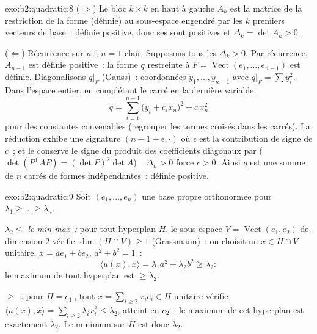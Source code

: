 \begin{solution}{exo:b2:quadratic:8}
($\Rightarrow$) Le bloc $k \times k$ en haut à gauche $A_k$ est la
matrice de la restriction de la forme (définie) au sous-espace
engendré par les $k$ premiers vecteurs de base~: définie positive,
donc ses  sont positives et $\Delta_k = \det A_k >
0$.

($\Leftarrow$) Récurrence sur $n$~; $n = 1$ clair. Supposons tous
les $\Delta_k > 0$. Par récurrence, $A_{n-1}$ est définie positive~:
la forme $q$ restreinte à $F = \operatorname{Vect}(e_1, \dots,
e_{n-1})$ est définie. Diagonalisons $q|_F$ (Gauss)~: coordonnées
$y_1, \dots, y_{n-1}$ avec $q|_F = \sum y_i^2$. Dans l'espace
entier, en complétant le carré en la dernière variable,
\[
q = \sum_{i=1}^{n-1} \bigl(y_i + c_i x_n\bigr)^2 + c\,x_n^2
\]
pour des constantes convenables (regrouper les termes croisés dans
les carrés). La réduction exhibe une signature $(n-1 + \epsilon,
\cdot)$ où $\epsilon$ est la contribution de signe de $c$~; et le
 conserve le signe du produit des coefficients diagonaux
par  ($\det(P^{\mathsf T}AP) = (\det P)^2\det A$)~:
$\Delta_n > 0$ force $c > 0$. Ainsi $q$ est une somme de $n$ carrés
de formes indépendantes~: définie positive.
\end{solution}

\begin{solution}{exo:b2:quadratic:9}
Soit $(e_1, \dots, e_n)$ une base propre orthonormée pour $\lambda_1
\geq \dots \geq \lambda_n$.

\emph{$\lambda_2 \leq$ le min-max~:} pour tout hyperplan $H$, le
sous-espace $V = \operatorname{Vect}(e_1, e_2)$ de dimension $2$
vérifie $\dim(H \cap V) \geq 1$ (Grassmann)~: on choisit un $x \in H
\cap V$ unitaire, $x = ae_1 + be_2$, $a^2 + b^2 = 1$~:
\[
\langle u(x), x\rangle = \lambda_1 a^2 + \lambda_2 b^2 \geq
\lambda_2 :
\]
le maximum de tout hyperplan est $\geq \lambda_2$.

\emph{$\geq$~:} pour $H = e_1^{\perp}$, tout $x = \sum_{i\geq2}
x_ie_i \in H$ unitaire vérifie $\langle u(x), x\rangle = \sum_{i
\geq 2} \lambda_i x_i^2 \leq \lambda_2$, atteint en $e_2$~: le
maximum de cet hyperplan est exactement $\lambda_2$. Le minimum sur
$H$ est donc $\lambda_2$.
\end{solution}

